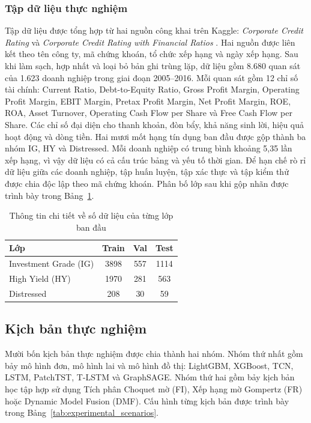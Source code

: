 \documentclass[10pt,twoside]{article}
\begin{document}
\subsubsection{Tập dữ liệu thực nghiệm}
Tập dữ liệu được tổng hợp từ hai nguồn công khai trên Kaggle: \textit{Corporate Credit Rating} \cite{noauthor_corporate_credit_rating_nodate} và \textit{Corporate Credit Rating with Financial Ratios} \cite{noauthor_corporate_financial_ratios_nodate}. Hai nguồn được liên kết theo tên công ty, mã chứng khoán, tổ chức xếp hạng và ngày xếp hạng. Sau khi làm sạch, hợp nhất và loại bỏ bản ghi trùng lặp, dữ liệu gồm 8.680 quan sát của 1.623 doanh nghiệp trong giai đoạn 2005--2016. Mỗi quan sát gồm 12 chỉ số tài chính: Current Ratio, Debt-to-Equity Ratio, Gross Profit Margin, Operating Profit Margin, EBIT Margin, Pretax Profit Margin, Net Profit Margin, ROE, ROA, Asset Turnover, Operating Cash Flow per Share và Free Cash Flow per Share. Các chỉ số đại diện cho thanh khoản, đòn bẩy, khả năng sinh lời, hiệu quả hoạt động và dòng tiền. Hai mươi mốt hạng tín dụng ban đầu được gộp thành ba nhóm IG, HY và Distressed. Mỗi doanh nghiệp có trung bình khoảng 5,35 lần xếp hạng, vì vậy dữ liệu có cả cấu trúc bảng và yếu tố thời gian. Để hạn chế rò rỉ dữ liệu giữa các doanh nghiệp, tập huấn luyện, tập xác thực và tập kiểm thử được chia độc lập theo mã chứng khoán. Phân bố lớp sau khi gộp nhãn được trình bày trong Bảng~\ref{tab:class_distribution}.
\begin{table}[H] 
\centering 
\caption{Thông tin chi tiết về số dữ liệu của từng lớp ban đầu} 
\label{tab:class_distribution} 
\begin{tabular}{lccc} 
\hline \textbf{Lớp} & \textbf{Train} & \textbf{Val} & \textbf{Test} \\ \hline Investment Grade (IG) & 3898 & 557 & 1114 \\ High Yield (HY) & 1970 & 281 & 563 \\ Distressed & 208 & 30 & 59 \\ \hline 
\end{tabular} 
\end{table}
\subsection{Kịch bản thực nghiệm}

Mười bốn kịch bản thực nghiệm được chia thành hai nhóm. Nhóm thứ nhất gồm bảy mô hình đơn, mô hình lai và mô hình đồ thị: LightGBM, XGBoost, TCN, LSTM, PatchTST, T-LSTM và GraphSAGE. Nhóm thứ hai gồm bảy kịch bản học tập hợp sử dụng Tích phân Choquet mờ (FI), Xếp hạng mờ Gompertz (FR) hoặc Dynamic Model Fusion (DMF). Cấu hình từng kịch bản được trình bày trong Bảng~\ref{tab:experimental_scenarios}.
\end{document}
